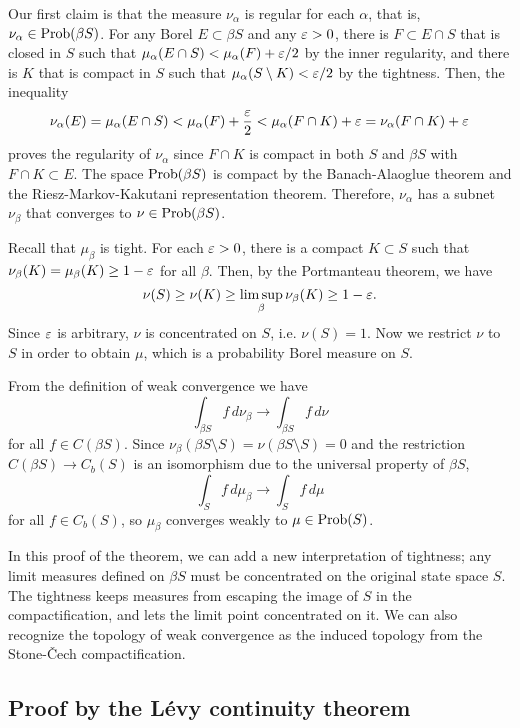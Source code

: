 \documentclass[a4paper]{article}
\begin{document}
\begin{pf}
Our first claim is that the measure $\nu_\alpha$ is regular for each $\alpha$, that is, $\nu_\alpha\in\operatorname{Prob}(\beta S)$.
For any Borel $E\subset\beta S$ and any $\varepsilon>0$, there is $F\subset E\cap S$ that is closed in $S$ such that $\mu_\alpha(E\cap S)<\mu_\alpha(F)+\varepsilon/2$ by the inner regularity, and there is $K$ that is compact in $S$ such that $\mu_\alpha(S\setminus K)<\varepsilon/2$ by the tightness.
Then, the inequality
\[\nu_\alpha(E)=\mu_\alpha(E\cap S)<\mu_\alpha(F)+\frac{\varepsilon}2<\mu_\alpha(F\cap K)+\varepsilon=\nu_\alpha(F\cap K)+\varepsilon\]
proves the regularity of $\nu_\alpha$ since $F\cap K$ is compact in both $S$ and $\beta S$ with $F\cap K\subset E$.
The space $\operatorname{Prob}(\beta S)$ is compact by the Banach-Alaoglue theorem and the Riesz-Markov-Kakutani representation theorem.
Therefore, $\nu_\alpha$ has a subnet $\nu_\beta$ that converges to $\nu\in\operatorname{Prob}(\beta S)$.

Recall that $\mu_\beta$ is tight.
For each $\varepsilon>0$, there is a compact $K\subset S$ such that $\nu_\beta(K)=\mu_\beta(K)\ge1-\varepsilon$ for all $\beta$.
Then, by the Portmanteau theorem, we have
\[\nu(S)\ge\nu(K)\ge\limsup_\beta\nu_\beta(K)\ge1-\varepsilon.\]
Since $\varepsilon$ is arbitrary, $\nu$ is concentrated on $S$, i.e. $\nu(S)=1$.
Now we restrict $\nu$ to $S$ in order to obtain $\mu$, which is a probability Borel measure on $S$.

From the definition of weak convergence we have
\[\int_{\beta S}f\,d\nu_\beta\to\int_{\beta S}f\,d\nu\]
for all $f\in C(\beta S)$.
Since $\nu_\beta(\beta S\setminus S)=\nu(\beta S\setminus S)=0$ and the restriction $C(\beta S)\to C_b(S)$ is an isomorphism due to the universal property of $\beta S$,
\[\int_Sf\,d\mu_\beta\to\int_Sf\,d\mu\]
for all $f\in C_b(S)$, so $\mu_\beta$ converges weakly to $\mu\in\operatorname{Prob}(S)$.
\end{pf}

In this proof of the theorem, we can add a new interpretation of tightness; any limit measures defined on $\beta S$ must be concentrated on the original state space $S$.
The tightness keeps measures from escaping the image of $S$ in the compactification, and lets the limit point concentrated on it.
We can also recognize the topology of weak convergence as the induced topology from the Stone-\v Cech compactification.



\subsection{Proof by the L\'evy continuity theorem}
\end{document}
